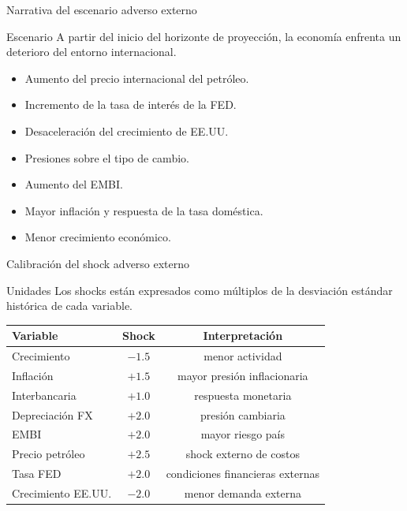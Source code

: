 \documentclass[10pt,aspectratio=169]{beamer}
\begin{document}
\begin{frame}{Narrativa del escenario adverso externo}

\begin{block}{Escenario}
A partir del inicio del horizonte de proyección, la economía enfrenta un deterioro del entorno internacional.
\end{block}

\begin{itemize}
    \item Aumento del precio internacional del petróleo.
    \item Incremento de la tasa de interés de la FED.
    \item Desaceleración del crecimiento de EE.UU.
    \item Presiones sobre el tipo de cambio.
    \item Aumento del EMBI.
    \item Mayor inflación y respuesta de la tasa doméstica.
    \item Menor crecimiento económico.
\end{itemize}

\end{frame}

\begin{frame}{Calibración del shock adverso externo}

\begin{block}{Unidades}
Los shocks están expresados como múltiplos de la desviación estándar histórica de cada variable.
\end{block}

\begin{table}
\centering
\small
\begin{tabular}{lcc}
\toprule
Variable & Shock & Interpretación \\
\midrule
Crecimiento & $-1.5$ & menor actividad \\
Inflación & $+1.5$ & mayor presión inflacionaria \\
Interbancaria & $+1.0$ & respuesta monetaria \\
Depreciación FX & $+2.0$ & presión cambiaria \\
EMBI & $+2.0$ & mayor riesgo país \\
Precio petróleo & $+2.5$ & shock externo de costos \\
Tasa FED & $+2.0$ & condiciones financieras externas \\
Crecimiento EE.UU. & $-2.0$ & menor demanda externa \\
\bottomrule
\end{tabular}
\end{table}

\end{frame}
\end{document}
